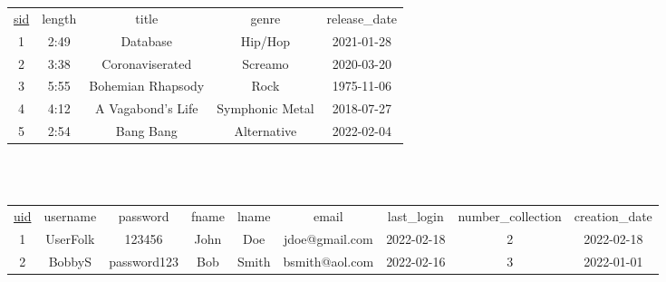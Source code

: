 \documentclass[12pt]{article}
\begin{document}
    \\~\\

    \begin{center}
        \begin{tabular}{ |c|c|c|c|c| }
            \hline
            \rowcolor{tablegrey} \multicolumn{5}{|c|}{Song} \\
            \hline
            \underline{sid} & length & title & genre & release\_date \\
            \hline
            1 & 2:49 & Database & Hip/Hop & 2021-01-28 \\
            \hline
            2 & 3:38 & Coronaviserated & Screamo & 2020-03-20 \\
            \hline
            3 & 5:55 & Bohemian Rhapsody & Rock & 1975-11-06 \\
            \hline
            4 & 4:12 & A Vagabond's Life & Symphonic Metal & 2018-07-27 \\
            \hline
            5 & 2:54 & Bang Bang & Alternative & 2022-02-04 \\
            \hline
        \end{tabular}
    \end{center}

    \\~\\

    \begin{table}
        \scriptsize
        \begin{center}
            \begin{tabular}{ |c|c|c|c|c|c|c|c|c| }
                \hline
                \rowcolor{tablegrey} \multicolumn{9}{|c|}{User} \\
                \hline
                \underline{uid} & username & password & fname & lname & email & last\_login & number\_collection & creation\_date \\
                \hline
                1 & UserFolk & 123456 & John & Doe & jdoe@gmail.com & 2022-02-18 & 2 & 2022-02-18\\
                \hline
                2 & BobbyS & password123 & Bob & Smith & bsmith@aol.com & 2022-02-16 & 3 & 2022-01-01 \\
                \hline
            \end{tabular}
        \end{center}
    \end{table}

    \\~\\
\end{document}
